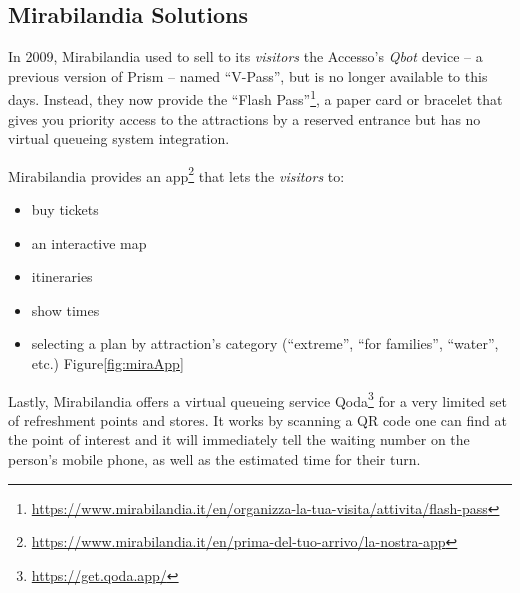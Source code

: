 \subsection{Mirabilandia Solutions}\label{subsec:mirabilandia-solutions}
In 2009, Mirabilandia used to sell to its \textit{visitors} the Accesso's \textit{Qbot} device -- a previous version of Prism -- named ``V-Pass''\cite{v-pass-mira}, but is no
longer available to this days.
Instead, they now provide the ``Flash Pass''\footnote{\url{https://www.mirabilandia.it/en/organizza-la-tua-visita/attivita/flash-pass}},
a paper card or bracelet that gives you priority access to the attractions by a reserved entrance but has no virtual queueing system integration.

Mirabilandia provides an app\footnote{\url{https://www.mirabilandia.it/en/prima-del-tuo-arrivo/la-nostra-app}} that lets the \textit{visitors} to:
\begin{itemize}
    \item buy tickets
    \item an interactive map
    \item itineraries
    \item show times
    \item selecting a plan by attraction's category (``extreme'', ``for families'', ``water'', etc.) Figure\ref{fig:miraApp}
\end{itemize}

Lastly, Mirabilandia offers a virtual queueing service Qoda\footnote{\url{https://get.qoda.app/}} for a very limited set of refreshment points
and stores.
It works by scanning a QR code one can find at the point of interest and it will immediately tell the waiting number on
the person's mobile phone, as well as the estimated time for their turn.



